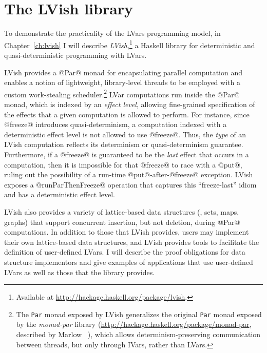 \section{The LVish library}\label{s:intro-lvish}


To demonstrate the practicality of the LVars programming model, in
Chapter~\ref{ch:lvish} I will describe
\emph{LVish},\footnote{Available at
  \url{http://hackage.haskell.org/package/lvish}.} a Haskell library
for deterministic and quasi-deterministic programming with LVars.

LVish provides a @Par@ monad for encapsulating parallel computation
and enables a notion of lightweight, library-level threads to be
employed with a custom work-stealing scheduler.\footnote{The
  \lstinline|Par| monad exposed by LVish generalizes the original
  \lstinline|Par| monad exposed by the \emph{monad-par} library
  ({\url{http://hackage.haskell.org/package/monad-par}}, described by
  Marlow \etal~\cite{monad-par}), which allows determinism-preserving
  communication between threads, but only through IVars, rather than
  LVars.}  LVar computations run inside the @Par@ monad, which is
indexed by an \emph{effect level}, allowing fine-grained specification
of the effects that a given computation is allowed to perform.  For
instance, since @freeze@ introduces quasi-determinism, a computation
indexed with a deterministic effect level is not allowed to use
@freeze@.  Thus, the \emph{type} of an LVish computation reflects its
determinism or quasi-determinism guarantee.  Furthermore, if a
@freeze@ is guaranteed to be the \emph{last} effect that occurs in a
computation, then it is impossible for that @freeze@ to race with a
@put@, ruling out the possibility of a run-time @put@-after-@freeze@
exception.  LVish exposes a @runParThenFreeze@ operation that captures
this ``freeze-last'' idiom and has a deterministic effect level.

LVish also provides a variety of lattice-based data structures (\eg,
sets, maps, graphs) that support concurrent insertion, but not
deletion, during @Par@ computations.  In addition to those that LVish
provides, users may implement their own lattice-based data structures,
and LVish provides tools to facilitate the definition of user-defined
LVars.  I will describe the proof obligations for data structure
implementors and give examples of applications that use user-defined
LVars as well as those that the library provides.

